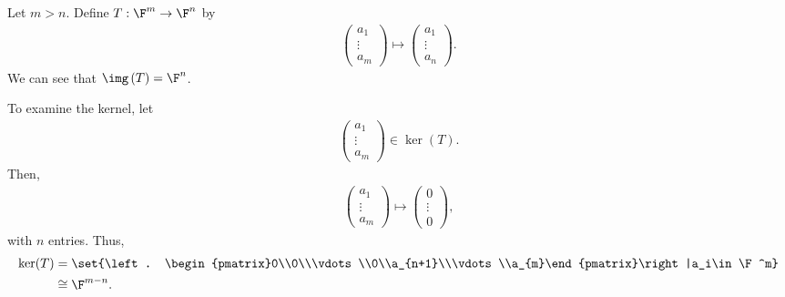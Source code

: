 \documentclass[10pt]{mypackage}
\begin{document}
\begin{example}
  Let $m > n$. Define $T: \F^{m}\rightarrow \F^n$ by
  \begin{align*}
    \begin{pmatrix}a_1\\\vdots\\a_m\end{pmatrix} \mapsto \begin{pmatrix}a_1\\\vdots\\a_n\end{pmatrix}.
  \end{align*}
  We can see that $\img\left(T\right) = \F^n$.\newline

  To examine the kernel, let
  \begin{align*}
    \begin{pmatrix}a_1\\\vdots\\a_m\end{pmatrix}\in \ker(T).
  \end{align*}
  Then,
  \begin{align*}
    \begin{pmatrix}a_1\\\vdots\\a_m\end{pmatrix}\mapsto \begin{pmatrix}0\\\vdots\\0\end{pmatrix},
  \end{align*}
  with $n$ entries. Thus,
  \begin{align*}
    \ker(T) &= \set{\left. \begin{pmatrix}0\\0\\\vdots\\0\\a_{n+1}\\\vdots\\a_{m}\end{pmatrix}\right|a_i\in \F^m}\\
            &\cong \F^{m-n}.
  \end{align*}
\end{example}
\end{document}
